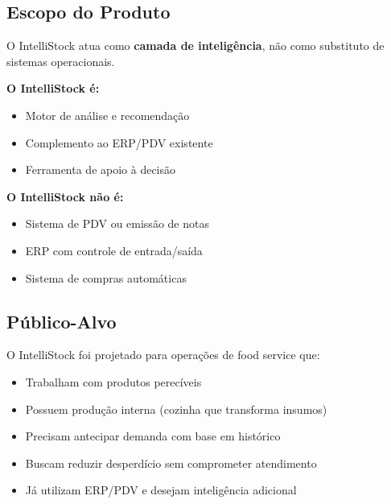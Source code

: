 \subsection{Escopo do Produto}

\begin{infobox}
O IntelliStock atua como \textbf{camada de inteligência}, não como substituto
de sistemas operacionais.
\end{infobox}

\textbf{O IntelliStock é:}
\begin{itemize}[leftmargin=2em]
  \item Motor de análise e recomendação
  \item Complemento ao ERP/PDV existente
  \item Ferramenta de apoio à decisão
\end{itemize}

\textbf{O IntelliStock não é:}
\begin{itemize}[leftmargin=2em]
  \item Sistema de PDV ou emissão de notas
  \item ERP com controle de entrada/saída
  \item Sistema de compras automáticas
\end{itemize}

\subsection{Público-Alvo}

O IntelliStock foi projetado para operações de food service que:

\begin{itemize}[leftmargin=2em]
  \item Trabalham com produtos perecíveis
  \item Possuem produção interna (cozinha que transforma insumos)
  \item Precisam antecipar demanda com base em histórico
  \item Buscam reduzir desperdício sem comprometer atendimento
  \item Já utilizam ERP/PDV e desejam inteligência adicional
\end{itemize}
